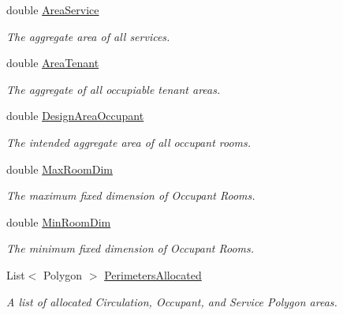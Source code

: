 \begin{DoxyCompactItemize}
double \mbox{\hyperlink{class_room_kit_1_1_scope_a363fdd1f291826cf4d4f34978fc50aad}{Area\+Service}}
\begin{DoxyCompactList}\small\item\em The aggregate area of all services. \end{DoxyCompactList}\item 
double \mbox{\hyperlink{class_room_kit_1_1_scope_ad1a4f86a420ad61e5bfddefbf684858f}{Area\+Tenant}}
\begin{DoxyCompactList}\small\item\em The aggregate of all occupiable tenant areas. \end{DoxyCompactList}\item 
double \mbox{\hyperlink{class_room_kit_1_1_scope_a71f0d1fbb750151e6c98c40cc57f1e80}{Design\+Area\+Occupant}}
\begin{DoxyCompactList}\small\item\em The intended aggregate area of all occupant rooms. \end{DoxyCompactList}\item 
double \mbox{\hyperlink{class_room_kit_1_1_scope_a53abe5f7d253df5d928a5bb9d400518f}{Max\+Room\+Dim}}
\begin{DoxyCompactList}\small\item\em The maximum fixed dimension of Occupant Rooms. \end{DoxyCompactList}\item 
double \mbox{\hyperlink{class_room_kit_1_1_scope_a4266a9754ac2ffa0020d89001ba7a972}{Min\+Room\+Dim}}
\begin{DoxyCompactList}\small\item\em The minimum fixed dimension of Occupant Rooms. \end{DoxyCompactList}\item 
List$<$ Polygon $>$ \mbox{\hyperlink{class_room_kit_1_1_scope_aa5d3dfbda9e48bd38d1a66bfe7fc1779}{Perimeters\+Allocated}}
\begin{DoxyCompactList}\small\item\em A list of allocated Circulation, Occupant, and Service Polygon areas. \end{DoxyCompactList}\item 

\end{DoxyCompactItemize}
